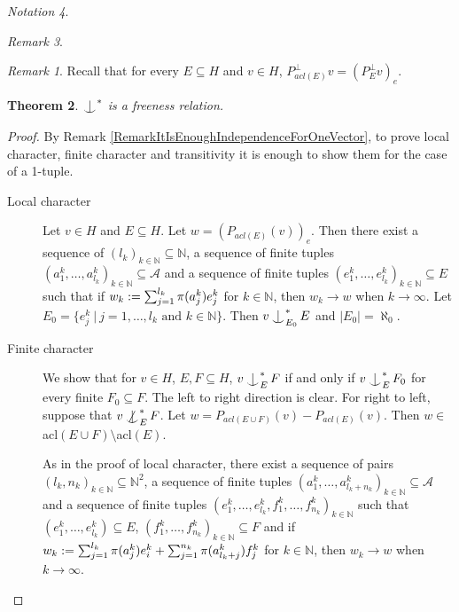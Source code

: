 \documentclass{amsart}
\makeatletter
\def\nindsym#1#2{%
  \setbox0=\hbox{$\m@th#1x$}%
  \kern\wd0%
  \hbox to 0pt{\mathchardef\nn="3236\hss$\m@th#1\nn$\kern1.4\wd0\hss}
  \hbox to 0pt{\hss$\m@th#1\mid$\hbox to 0pt{$\m@th#1^{#2}$}\hss}%
  \lower.9\ht0\hbox to 0pt{\hss$\m@th#1\smile$\hss}%
  \kern\wd0}
\newcommand{\nind}[1][]{\mathop{\mathpalette\nindsym{#1}}}
\def\brm{\begin{rem}}\def\erm{\end{rem}}
\def\A{\mathcal{A}}
\newtheorem{theo}{Theorem}[section]
\theoremstyle{definition}
\theoremstyle{remark}
\newtheorem{rem}[theo]{Remark}
\newtheorem{nota}[theo]{Notation}
\newcommand{\N}{\ensuremath{\mathbb{N}}}
\makeatother
\begin{document}
\begin{nota}
\begin{rem}
\brm
Recall that for every $E\subseteq H$ and $v\in H$, $P^\perp_{acl(E)}v=(P^\perp_Ev)_e$.
\erm

\begin{theo}\label{explicitnonforkingrelation}
$\ind^*$ is a freeness relation.
\end{theo}
\begin{proof}
By Remark \ref{RemarkItIsEnoughIndependenceForOneVector}, to prove local character, finite character and transitivity it is enough to show them for the case of a 1-tuple. 
\begin{description}
   \item[Local character]
Let $v\in H$ and $E\subseteq H$. Let $w=(P_{acl(E)}(v))_e$. Then there exist a sequence of $(l_k)_{k\in\N}\subseteq \N$, a sequence of finite tuples $(a_1^k,\dots,a_{l_k}^k)_{k\in\N}\subseteq \A$ and a sequence of finite tuples $(e_1^k,\dots,e_{l_k}^k)_{k\in\N}\subseteq E$ such that if $w_k:=\sum_{j=1}^{l_k}\pi(a_j^k)e_j^k$ for $k\in\N$, then $w_k\to w$ when $k\to\infty$. Let $E_0=\{e_j^k\ |\ j=1,\dots,l_k\text{ and }k\in\N\}$. Then $v\ind_{E_0}^*E$ and $|E_0|=\aleph_0$.
   \item[Finite character] We show that for $v\in H$, $E,F\subseteq H$, $v\ind^*_EF$ if and only if $v\ind^*_EF_0$ for every finite $F_0\subseteq F$. The left to right direction is clear. For right to left, suppose that $v\nind^*_EF$. Let $w=P_{acl(E\cup F)}(v)-P_{acl(E)}(v)$. Then $w\in$ acl$(E\cup F)\setminus$acl$(E)$. 
   
As in the proof of local character, there exist a sequence of pairs $(l_k,n_k)_{k\in\N}\subseteq \N^2$, a sequence of finite tuples $(a_1^k,\dots,a_{l_k+n_k}^k)_{k\in\N}\subseteq \A$ and a sequence of finite tuples $(e_1^k,\dots,e_{l_k}^k,f_1^k,\dots,f_{n_k}^k)_{k\in\N}$ such that $(e_1^k,\dots,e_{l_k}^k)\subseteq E$, $(f_1^k,\dots,f_{n_k}^k)_{k\in\N}\subseteq F$ and if $w_k:=\sum_{j=1}^{l_k}\pi(a_j^k)e_i^k+\sum_{j=1}^{n_k}\pi(a_{l_k+j}^k)f_j^k$ for $k\in\N$, then $w_k\to w$ when $k\to\infty$.


\end{description}
\end{proof}
\end{rem}
\end{nota}
\end{document}
